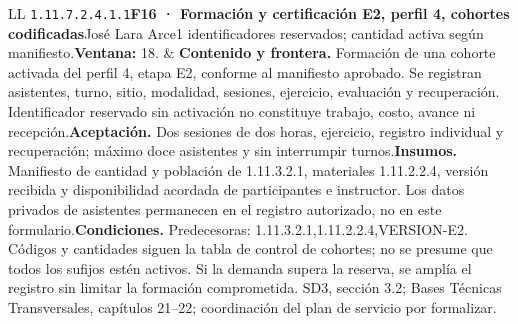 \begin{longtable}{L{\tabcolsep\relax}L{\tabcolsep\relax}}
\texttt{1.\allowbreak{}11.\allowbreak{}7.\allowbreak{}2.\allowbreak{}4.\allowbreak{}1.\allowbreak{}1}\newline{}\textbf{F16 · Formación y certificación E2, perfil 4, cohortes codificadas}\newline{}José Lara Arce\newline{}1 identificadores reservados; cantidad activa según manifiesto.\newline{}\textbf{Ventana:} 18. & \textbf{Contenido y frontera.} Formación de una cohorte activada del perfil 4, etapa E2, conforme al manifiesto aprobado. Se registran asistentes, turno, sitio, modalidad, sesiones, ejercicio, evaluación y recuperación. Identificador reservado sin activación no constituye trabajo, costo, avance ni recepción.\newline{}\textbf{Aceptación.} Dos sesiones de dos horas, ejercicio, registro individual y recuperación; máximo doce asistentes y sin interrumpir turnos.\newline{}\textbf{Insumos.} Manifiesto de cantidad y población de 1.11.3.2.1, materiales 1.11.2.2.4, versión recibida y disponibilidad acordada de participantes e instructor. Los datos privados de asistentes permanecen en el registro autorizado, no en este formulario.\newline{}\textbf{Condiciones.} Predecesoras: 1.11.3.2.1,1.11.2.2.4,VERSION-E2. Códigos y cantidades siguen la tabla de control de cohortes; no se presume que todos los sufijos estén activos. Si la demanda supera la reserva, se amplía el registro sin limitar la formación comprometida. SD3, sección 3.2; Bases Técnicas Transversales, capítulos 21--22; coordinación del plan de servicio por formalizar.\\\hline

\end{longtable}

